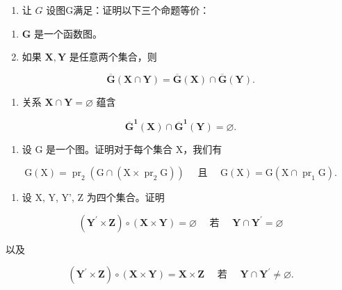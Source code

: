 \exercisegroup

\begin{enumerate}
\def\labelenumi{\arabic{enumi}.}
\tightlist
\item
  让 \(G\) 设图G满足：证明以下三个命题等价：
\end{enumerate}

\begin{enumerate}
\def\labelenumi{(\alph{enumi})}
\item
  \(\mathbf{G}\) 是一个函数图。
\item
  如果 \(\mathbf{X},\mathbf{Y}\) 是任意两个集合，则
\end{enumerate}

\[
\overline {{{\mathbf {G}}}} (\mathbf {X} \cap \mathbf {Y}) = \overline {{{\mathbf {G}}}} (\mathbf {X}) \cap \overline {{{\mathbf {G}}}} (\mathbf {Y}).
\]

\begin{enumerate}
\def\labelenumi{(\alph{enumi})}
\setcounter{enumi}{2}
\tightlist
\item
  关系 \(\mathbf{X} \cap \mathbf{Y} = \varnothing\) 蕴含
\end{enumerate}

\[
\overline {{\mathbf {G}}} ^ {\mathbf {1}} (\mathbf {X}) \cap \overline {{\mathbf {G}}} ^ {\mathbf {1}} (\mathbf {Y}) = \varnothing .
\]

\begin{enumerate}
\def\labelenumi{\arabic{enumi}.}
\setcounter{enumi}{1}
\tightlist
\item
  设 G 是一个图。证明对于每个集合 X，我们有
\end{enumerate}

\[
\mathrm{G} (\mathrm{X}) = \operatorname{pr} _ {2} (\mathrm{G} \cap (\mathrm{X} \times \operatorname{pr} _ {2} \mathrm{G})) \quad \text { 且 } \quad \mathrm{G} (\mathrm{X}) = \mathrm{G} (\mathrm{X} \cap \operatorname{pr} _ {1} \mathrm{G}).
\]

\begin{enumerate}
\def\labelenumi{\arabic{enumi}.}
\setcounter{enumi}{2}
\tightlist
\item
  设 X, Y, Y', Z 为四个集合。证明
\end{enumerate}

\[
(\mathbf {Y} ^ {\prime} \times \mathbf {Z}) \circ (\mathbf {X} \times \mathbf {Y}) = \varnothing \quad \text { 若 } \quad \mathbf {Y} \cap \mathbf {Y} ^ {\prime} = \varnothing
\]

以及

\[
(\mathbf {Y} ^ {\prime} \times \mathbf {Z}) \circ (\mathbf {X} \times \mathbf {Y}) = \mathbf {X} \times \mathbf {Z} \quad \text { 若 } \quad \mathbf {Y} \cap \mathbf {Y} ^ {\prime} \neq \varnothing .
\]

